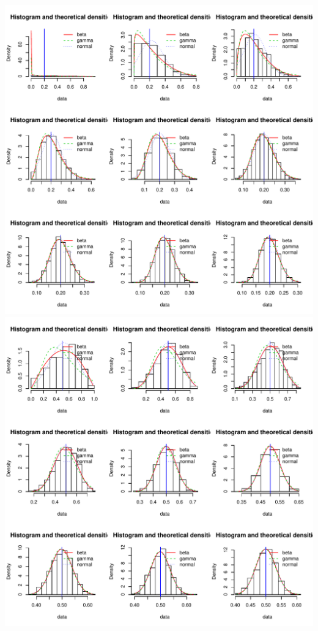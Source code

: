 \documentclass[]{article}
\begin{document}
\includegraphics{2016_w09_files/figure-latex/unnamed-chunk-12-1.pdf}
\includegraphics{2016_w09_files/figure-latex/unnamed-chunk-12-2.pdf}
\end{document}
